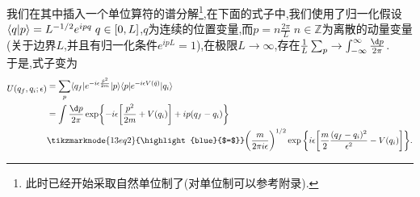 我们在其中插入一个单位算符的谱分解\footnote{此时已经开始采取自然单位制了(对单位制可以参考附录).},在下面的式子中,我们使用了归一化假设$\langle q|p\rangle=L^{-1/2}e^{ipq}\;q\in[0,L]$,$ q $为连续的位置变量,而$p=n\frac{2\pi}L\;n\in \mathbb Z$为离散的动量变量(关于边界$ L $,并且有归一化条件$e^{ipL}=1$),在极限$L\to\infty$,存在$\frac1L\sum_p\to\int_{-\infty}^\infty\frac{\d p}{2\pi}$.\\
于是,式子变为
\begin{equation}
	\vspace{\baselineskip}
	\begin{aligned}
		U(q_f,q_i;\epsilon)& \begin{aligned}&=\sum_p\langle q_f|e^{-i\epsilon\frac{\hat{p}^2}{2m}}|p\rangle\langle p|e^{-i\epsilon V(\hat{q})}|q_i\rangle\end{aligned} \\
		&=\int\frac{\d p}{2\pi}\exp\biggl\{-i\epsilon\biggl[\frac{p^2}{2m}+V(q_i)\biggr]+ip(q_f-q_i)\biggr\} \\
		&\tikzmarknode{13eq2}{\highlight{blue}{$=$}}\bigg(\frac{m}{2\pi i\epsilon}\bigg)^{1/2}\exp\bigg\{i\epsilon\bigg[\frac{m}{2}\frac{(q_{f}-q_{i})^{2}}{\epsilon^{2}}-V(q_{i})\bigg]\bigg\}.
	\end{aligned}
\end{equation}

